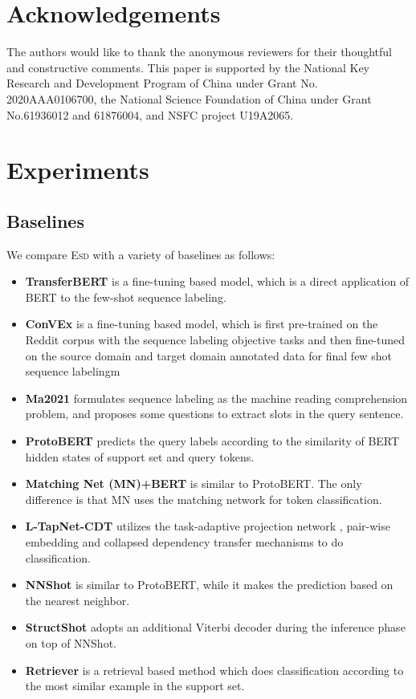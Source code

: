 \documentclass[11pt]{article}
\newcommand{\modelname}{\textsc{Esd}\xspace}
\begin{document}
\section*{Acknowledgements}
The authors would like to thank the anonymous reviewers for their thoughtful and constructive comments.
This paper is supported by the National Key Research and Development Program of China under Grant No. 2020AAA0106700, the National Science Foundation of China under Grant No.61936012 and 61876004, and NSFC project U19A2065.





\clearpage
\appendix
\section{Experiments}
\label{app:exp}
\subsection{Baselines}
We compare \modelname with a variety of baselines as follows:
\begin{itemize}
    \item \textbf{TransferBERT} \cite{fewshothou} is a fine-tuning based model, which is a direct application of BERT \cite{Bert} to the few-shot sequence labeling.
    \item \textbf{ConVEx} \cite{convex} is a fine-tuning based model, which is first pre-trained on the Reddit corpus with the sequence labeling objective tasks and then fine-tuned on the source domain and target domain annotated data for final few shot sequence labelingm    \item \textbf{Ma2021} \cite{mrc-few-slot} formulates sequence labeling as the machine reading comprehension problem, and proposes some questions to extract slots in the query sentence.
    \item \textbf{ProtoBERT} \cite{WarmProtoZero}  predicts the query labels according to the similarity of BERT hidden states of support set and query tokens.
    \item  \textbf{Matching Net (MN)+BERT} \cite{fewshothou} is similar to ProtoBERT. The only difference is that MN uses the matching network \cite{MN} for token classification.
    \item \textbf{L-TapNet-CDT} \cite{fewshothou} utilizes the task-adaptive projection network \cite{yoon2019tapnet}, pair-wise embedding and collapsed dependency transfer mechanisms to do classification.
    \item  \textbf{NNShot} \cite{NNshot} is similar to ProtoBERT, while it makes the prediction based on the nearest neighbor.
    \item  \textbf{StructShot} \cite{NNshot} adopts an additional Viterbi decoder during the inference phase on top of NNShot. 
    \item \textbf{Retriever} \cite{span-naacl} is a retrieval based method which does classification according to the most similar example in the support set.
\end{itemize}
\end{document}
